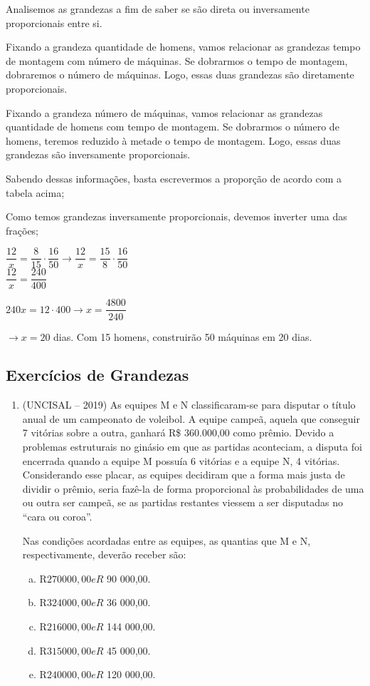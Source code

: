 \begin{multicols*}{2}
	Analisemos as grandezas a fim de saber se são direta ou inversamente proporcionais entre si.

	Fixando a grandeza quantidade de homens, vamos relacionar as grandezas tempo de montagem com número de máquinas. Se dobrarmos o tempo de montagem, dobraremos o número de máquinas. Logo, essas duas grandezas são diretamente proporcionais.

	Fixando a grandeza número de máquinas, vamos relacionar as grandezas quantidade de homens com tempo de montagem. Se dobrarmos o número de homens, teremos reduzido à metade o tempo de montagem. Logo, essas duas grandezas são inversamente proporcionais.

	Sabendo dessas informações, basta escrevermos a proporção de acordo com a tabela acima;

	Como temos grandezas inversamente proporcionais, devemos inverter uma das frações;

	{$ \dfrac{12}{x} = \dfrac{8}{15} \cdot \dfrac{16}{50} \to \dfrac{12}{x} = \dfrac{15}{8} \cdot \dfrac{16}{50}  $}\\

	{$ \dfrac{12}{x} = \dfrac{240}{400}$}

	{$ 240x = 12 \cdot 400 \to x = \dfrac{4800}{240}$}

	{$ \to x = 20 $} dias. Com 15 homens, construirão 50 máquinas em 20 dias.

	\subsection*{Exercícios de Grandezas}

	\begin{enumerate}[wide, labelwidth=!, labelindent=0pt]

		\item (UNCISAL -- 2019) As equipes M e N classificaram-se para disputar o título anual de um campeonato de voleibol. A equipe campeã, aquela que conseguir 7 vitórias sobre a outra, ganhará R\$ 360.000,00 como prêmio. Devido a problemas estruturais no ginásio em que as partidas aconteciam, a disputa foi encerrada quando a equipe M possuía 6 vitórias e a equipe N, 4 vitórias. Considerando esse placar, as equipes decidiram que a forma mais justa de dividir o prêmio, seria fazê-la de forma proporcional às probabilidades de uma ou outra ser campeã, se as partidas restantes viessem a ser disputadas no “cara ou coroa”.

		      Nas condições acordadas entre as equipes, as quantias que M e N, respectivamente, deverão receber são:
		\begin{enumerate}[(a)]
			\item R$ 270 000,00 e R$ 90 000,00.
			\item R$ 324 000,00 e R$ 36 000,00.
			\item R$ 216 000,00 e R$ 144 000,00.
			\item R$ 315 000,00 e R$ 45 000,00.
			\item R$ 240 000,00 e R$ 120 000,00.
		\end{enumerate}


\end{enumerate}
\end{multicols*}
